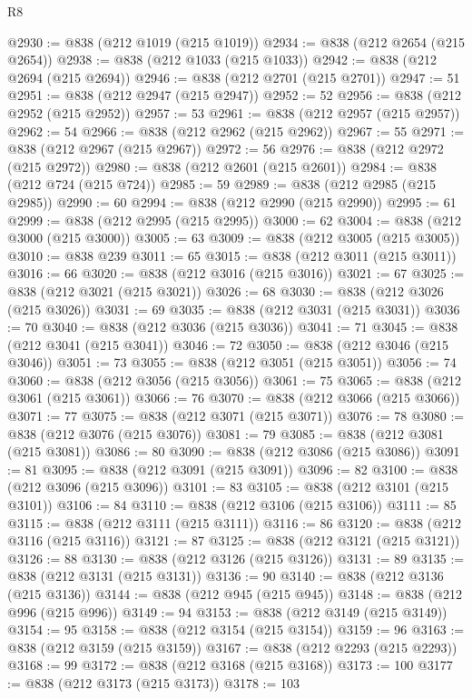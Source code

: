 \begin{lexlean}{R8}
\begin{coremodule}
@2930 := @838 (@212 @1019 (@215 @1019))
@2934 := @838 (@212 @2654 (@215 @2654))
@2938 := @838 (@212 @1033 (@215 @1033))
@2942 := @838 (@212 @2694 (@215 @2694))
@2946 := @838 (@212 @2701 (@215 @2701))
@2947 := 51
@2951 := @838 (@212 @2947 (@215 @2947))
@2952 := 52
@2956 := @838 (@212 @2952 (@215 @2952))
@2957 := 53
@2961 := @838 (@212 @2957 (@215 @2957))
@2962 := 54
@2966 := @838 (@212 @2962 (@215 @2962))
@2967 := 55
@2971 := @838 (@212 @2967 (@215 @2967))
@2972 := 56
@2976 := @838 (@212 @2972 (@215 @2972))
@2980 := @838 (@212 @2601 (@215 @2601))
@2984 := @838 (@212 @724 (@215 @724))
@2985 := 59
@2989 := @838 (@212 @2985 (@215 @2985))
@2990 := 60
@2994 := @838 (@212 @2990 (@215 @2990))
@2995 := 61
@2999 := @838 (@212 @2995 (@215 @2995))
@3000 := 62
@3004 := @838 (@212 @3000 (@215 @3000))
@3005 := 63
@3009 := @838 (@212 @3005 (@215 @3005))
@3010 := @838 @239
@3011 := 65
@3015 := @838 (@212 @3011 (@215 @3011))
@3016 := 66
@3020 := @838 (@212 @3016 (@215 @3016))
@3021 := 67
@3025 := @838 (@212 @3021 (@215 @3021))
@3026 := 68
@3030 := @838 (@212 @3026 (@215 @3026))
@3031 := 69
@3035 := @838 (@212 @3031 (@215 @3031))
@3036 := 70
@3040 := @838 (@212 @3036 (@215 @3036))
@3041 := 71
@3045 := @838 (@212 @3041 (@215 @3041))
@3046 := 72
@3050 := @838 (@212 @3046 (@215 @3046))
@3051 := 73
@3055 := @838 (@212 @3051 (@215 @3051))
@3056 := 74
@3060 := @838 (@212 @3056 (@215 @3056))
@3061 := 75
@3065 := @838 (@212 @3061 (@215 @3061))
@3066 := 76
@3070 := @838 (@212 @3066 (@215 @3066))
@3071 := 77
@3075 := @838 (@212 @3071 (@215 @3071))
@3076 := 78
@3080 := @838 (@212 @3076 (@215 @3076))
@3081 := 79
@3085 := @838 (@212 @3081 (@215 @3081))
@3086 := 80
@3090 := @838 (@212 @3086 (@215 @3086))
@3091 := 81
@3095 := @838 (@212 @3091 (@215 @3091))
@3096 := 82
@3100 := @838 (@212 @3096 (@215 @3096))
@3101 := 83
@3105 := @838 (@212 @3101 (@215 @3101))
@3106 := 84
@3110 := @838 (@212 @3106 (@215 @3106))
@3111 := 85
@3115 := @838 (@212 @3111 (@215 @3111))
@3116 := 86
@3120 := @838 (@212 @3116 (@215 @3116))
@3121 := 87
@3125 := @838 (@212 @3121 (@215 @3121))
@3126 := 88
@3130 := @838 (@212 @3126 (@215 @3126))
@3131 := 89
@3135 := @838 (@212 @3131 (@215 @3131))
@3136 := 90
@3140 := @838 (@212 @3136 (@215 @3136))
@3144 := @838 (@212 @945 (@215 @945))
@3148 := @838 (@212 @996 (@215 @996))
@3149 := 94
@3153 := @838 (@212 @3149 (@215 @3149))
@3154 := 95
@3158 := @838 (@212 @3154 (@215 @3154))
@3159 := 96
@3163 := @838 (@212 @3159 (@215 @3159))
@3167 := @838 (@212 @2293 (@215 @2293))
@3168 := 99
@3172 := @838 (@212 @3168 (@215 @3168))
@3173 := 100
@3177 := @838 (@212 @3173 (@215 @3173))
@3178 := 103

\end{coremodule}
\end{lexlean}
